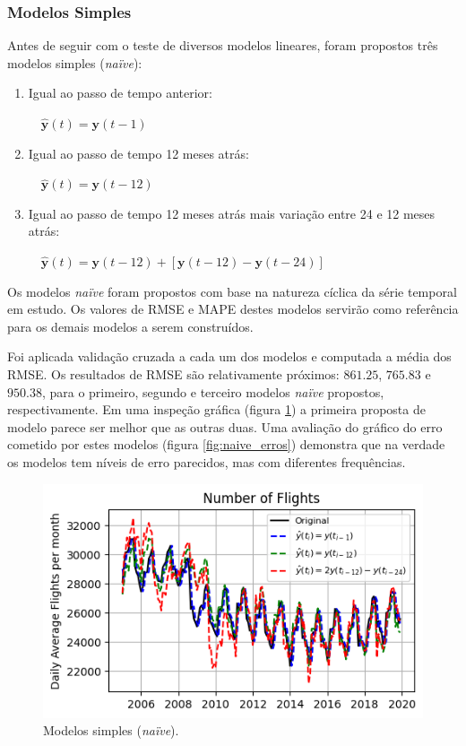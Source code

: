 \documentclass[final,5p]{elsarticle}
\numberwithin{equation}{section}
\begin{document}
    \subsubsection{Modelos Simples}

    Antes de seguir com o teste de diversos modelos lineares, foram propostos três modelos simples (\emph{naïve}):
    \begin{enumerate}
        \item Igual ao passo de tempo anterior:

        $\quad \hat{\textbf{y}}(t) = \textbf{y}(t-1)$

        \item Igual ao passo de tempo 12 meses atrás:

        $\quad \hat{\textbf{y}}(t) = \textbf{y}(t-12)$

        \item Igual ao passo de tempo 12 meses atrás mais variação entre 24 e 12 meses atrás:

        $\quad \hat{\textbf{y}}(t) = \textbf{y}(t-12) + [\textbf{y}(t-12) - \textbf{y}(t-24)]$
    \end{enumerate}

    Os modelos \emph{naïve} foram propostos com base na natureza cíclica da série temporal em estudo. Os valores de RMSE e MAPE destes modelos servirão como referência para os demais modelos a serem construídos.

    Foi aplicada validação cruzada a cada um dos modelos e computada a média dos RMSE. Os resultados de RMSE são relativamente próximos: $861.25$, $765.83$ e $950.38$, para o primeiro, segundo e terceiro modelos \emph{naïve} propostos, respectivamente. Em uma inspeção gráfica (figura \ref{fig:naive}) a primeira proposta de modelo parece ser melhor que as outras duas. Uma avaliação do gráfico do erro cometido por estes modelos (figura \ref{fig:naive_erros}) demonstra que na verdade os modelos tem níveis de erro parecidos, mas com diferentes frequências.

        \begin{figure}[hbt!]
            \includegraphics[width=0.95\columnwidth]{B1_Naive.png}
            \caption{Modelos simples (\emph{naïve}).}
            \label{fig:naive}
        \end{figure}
\end{document}
